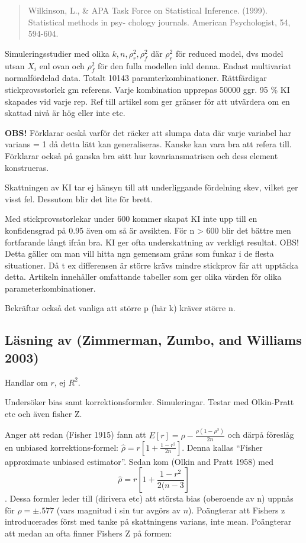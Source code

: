 \documentclass[]{article}
\begin{document}
\begin{quote}
Wilkinson, L., \& APA Task Force on Statistical Inference. (1999).
Statistical methods in psy- chology journals. American Psychologist, 54,
594-604.
\end{quote}

Simuleringsstudier med olika \(k, n, \rho^2_r, \rho^2_f\) där
\(\rho^2_r\) för reduced model, dvs model utsan \(X_i\) enl ovan och
\(\rho^2_f\) för den fulla modellen inkl denna. Endast multivariat
normalfördelad data. Totalt 10143 paramterkombinationer. Rättfärdigar
stickprovsstorlek gm referens. Varje kombination upprepas 50000 ggr. 95
\% KI skapades vid varje rep. Ref till artikel som ger gränser för att
utvärdera om en skattad nivå är hög eller inte etc.

\textbf{OBS!} Förklarar ocskå varför det räcker att slumpa data där
varje variabel har varians = 1 då detta lätt kan generaliseras. Kanske
kan vara bra att refera till. Förklarar också på ganska bra sätt hur
kovariansmatrisen och dess element konstrueras.

Skattningen av KI tar ej hänsyn till att underliggande fördelning skev,
vilket ger visst fel. Dessutom blir det lite för brett.

Med stickprovsstorlekar under 600 kommer skapat KI inte upp till en
konfidensgrad på 0.95 även om så är avsikten. För n \textgreater{} 600
blir det bättre men fortfarande långt ifrån bra. KI ger ofta
underskattning av verkligt resultat. OBS! Detta gäller om man vill hitta
ngn gemensam gräns som funkar i de flesta situationer. Då t ex
differensen är större krävs mindre stickprov fär att upptäcka detta.
Artikeln innehåller omfattande tabeller som ger olika värden för olika
parameterkombinationer.

Bekräftar också det vanliga att större p (här k) kräver större n.

\subsection{Läsning av (Zimmerman, Zumbo, and Williams
2003)}\label{lasning-av-zimmerman2003}

Handlar om \(r\), ej \(R^2\).

Undersöker bias samt korrektionsformler. Simuleringar. Testar med
Olkin-Pratt etc och även fisher Z.

Anger att redan (Fisher 1915) fann att
\(E[r] = \rho- \frac{\rho(1-\rho^2)}{2n}\) och därpå föreslåg en
unbiased korrektions-formel:
\(\hat{\rho} = r\left[ 1 + \frac{1-r^2}{2n}\right]\). Denna kallas
``Fisher approximate unbiased estimator''. Sedan kom (Olkin and Pratt
1958) med \[\hat{\rho} = r\left[ 1 + \frac{1-r^2}{2(n-3}\right]\]. Dessa
formler leder till (dirivera etc) att största bias (oberoende av n)
uppnås för \(\rho = \pm .577\) (vars magnitud i sin tur avgörs av
\(n\)). Poängterar att Fishers z introducerades först med tanke på
skattningens varians, inte mean. Poängterar att medan an ofta finner
Fishers Z på formen:
\end{document}
